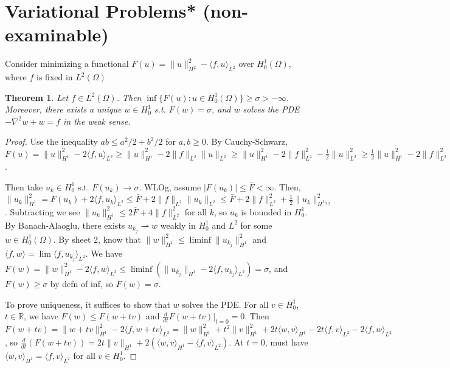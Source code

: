 \documentclass{article}
\theoremstyle{definition}
\theoremstyle{remark}
\theoremstyle{plain}
\newtheorem{thm}[defn]{Theorem}
\newcommand{\RR}{\mathbb{R}}
\begin{document}
\section{Variational Problems* (non-examinable)}
Consider minimizing a functional $F(u)=\|u\|_{H^2}^2-\langle f,u\rangle_{L^2}$ over $H_0^1(\Omega)$, where $f$ is fixed in $L^2(\Omega)$
\begin{thm}
    Let $f\in L^2(\Omega)$. Then $\inf\{F(u):u\in H_0^1(\Omega)\}\ge\sigma>-\infty$. Moreover, there exists a unique $w\in H_0^1$ s.t. $F(w)=\sigma$, and $w$ solves the PDE $-\nabla^2 w+w=f$ in the weak sense.
\end{thm}
\begin{proof}
    Use the inequality $ab\le a^2/2+b^2/2$ for $a,b\ge 0$. By Cauchy-Schwarz, $F(u)=\|u\|_{H^1}^2-2\langle f,u\rangle_{L^2}\ge\|u\|_{H^1}^2-2\|f\|_{L^2}\|u\|_{L^2}\ge \|u\|_{H^1}^2-2\|f\|_{L^2}^2-\frac{1}{2}\|u\|_{L^2}^2\ge \frac12\|u\|_{H^1}^2-2\|f\|_{L^2}^2\ge -2\|f\|_{L^2}>-\infty$.

    Then take $u_k\in H_0^1$ s.t. $F(u_k)\to\sigma$. WLOg, assume $|F(u_k)|\le\bar F<\infty$. Then, 
    $\|u_k\|_{H^1}^2=F(u_k)+2\langle f,u_k\rangle_{L^2}\le \bar F+2\|f\|_{L^2}\|u_k\|_{L^2}\le \bar F+2\|f\|_{L^2}^2+\frac{1}{2}\|u_k\|_{H^1??}^2$. Subtracting we see $\|u_k\|_{H^1}^2\le 2\bar F+4\|f\|_{L^2}^2$ for all $k$, so $u_k$ is bounded in $H_0^1$. By Banach-Alaoglu, there exists $u_{k_j}\rightharpoonup w$ weakly in $H_0^1$ and $L^2$ for some $w\in H_0^1(\Omega)$. By sheet 2, know that $\|w\|_{H^1}^2\le\liminf\|u_{k_j}\|_{H^1}^2$ and $\langle f,w\rangle=\lim\langle f,u_{k_j}\rangle_{L^2}$. We have $F(w)=\|w\|_{H^1}^2-2\langle f,w\rangle_{L^2}\le\liminf(\|u_{k_j}\|_{H^1}-2\langle f, u_{k_j}\rangle_{L^2})=\sigma$, and $F(w)\ge\sigma$ by defn of inf, so $F(w)=\sigma$.

    To prove uniqueness, it suffices to show that $w$ solves the PDE. For all $v\in H_0^1$, $t\in \RR$, we have $F(w)\le F(w+tv)$ and $\frac{d}{dt}F(w+tv)|_{t=0}=0$. Then $F(w+tv)=\|w+tv\|_{H^1}^2-2\langle f,w+tv\rangle_{L^2}=\|w\|_{H^1}^2+t^2\|v\|_{H^1}^2+2t\langle w,v\rangle_{H^1}-2t\langle f,v\rangle_{L^2}-2\langle f,w\rangle_{L^2}$, so
    $\frac{d}{dt}(F(w+tv))=2t\|v\|_{H^1}+2(\langle w,v\rangle_{H^1}-\langle f,v\rangle_{L^2})$. At $t=0$, must have $\langle w,v\rangle_{H^1}=\langle f,v\rangle_{L^2}$ for all $v\in H_0^1$.
\end{proof}
\end{document}
